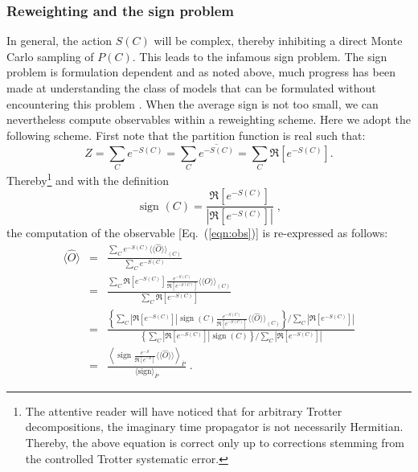 \subsubsection{Reweighting and the sign problem}\label{sec:reweight}

In general, the action  $S(C) $ will be complex, thereby inhibiting a direct Monte Carlo sampling of $P(C)$.   This leads to the infamous sign problem.     The sign problem is formulation dependent and as noted above, much progress has been made at understanding the class of models that  can be formulated without encountering this problem 
\cite{Wu04,Huffman14,Yao14a,Wei16}.  When the average sign is not too small, we can nevertheless  compute observables within a reweighting scheme.   Here we adopt the following scheme. First  note  that the partition function is real such that: 
\begin{equation}
	Z =   \sum_{C}  e^{-S(C)}    =  \sum_{C}  \overline{e^{-S(C)}} = \sum_{C}  \Re \left[e^{-S(C)} \right]. 
\end{equation}
Thereby\footnote{The attentive reader will have noticed that   for arbitrary Trotter decompositions,  the  imaginary time propagator is not necessarily Hermitian. Thereby, the above equation is correct only up to corrections stemming from the  controlled Trotter systematic error. }
and with the definition
\begin{equation}
\label{Sign.eq}
	 \text{ sign }(C)   =  \frac{   \Re \left[e^{-S(C)} \right]  } {\left| \Re \left[e^{-S(C)} \right]  \right|  }\;,
\end{equation}
the computation of the observable [Eq.~(\ref{eqn:obs})] is re-expressed as follows:
\begin{eqnarray}\label{eqn:obs_rw}
\langle \hat{O}  \rangle  &=&  \frac{\sum_{C}  e^{-S(C)} \langle \langle \hat{O}  \rangle \rangle_{(C)} }{\sum_{C}  e^{-S(C)}}       \nonumber \\ 
                          &=&  \frac{\sum_{C}   \Re \left[e^{-S(C)} \right]    \frac{e^{-S(C)}} {\Re \left[e^{-S(C)} \right]}  \langle \langle \hat{O}  \rangle \rangle_{(C)} }{\sum_{C}   \Re \left[e^{-S(C)} \right]}    \nonumber \\ 
          &=&
   \frac{
     \left\{
      \sum_{C}  \left| \Re \left[e^{-S(C)} \right]  \right|   \text{ sign }(C)   \frac{e^{-S(C)}} {\Re \left[e^{-S(C)} \right]}  \langle \langle \hat{O}  \rangle \rangle_{(C)}  \right\}/
            \sum_{C}  \left| \Re \left[ e^{-S(C)} \right] \right|  
          }  
          { 
          \left\{ \sum_{C}  \left|  \Re \left[ e^{-S(C)} \right]   \right|   \text{ sign }(C) \right\}/
            \sum_{C}   \left| \Re \left[ e^{-S(C)} \right] \right|  
          } \nonumber\\
          &=&
  	 \frac{  \left\langle  \text{ sign }   \frac{e^{-S}} {\Re \left[e^{-S} \right]}  \langle \langle \hat{O}  \rangle \rangle  \right\rangle_{\overline{P}} } { \langle \text{sign}   \rangle_{\overline{P}}}  \;.      
\end{eqnarray} 
